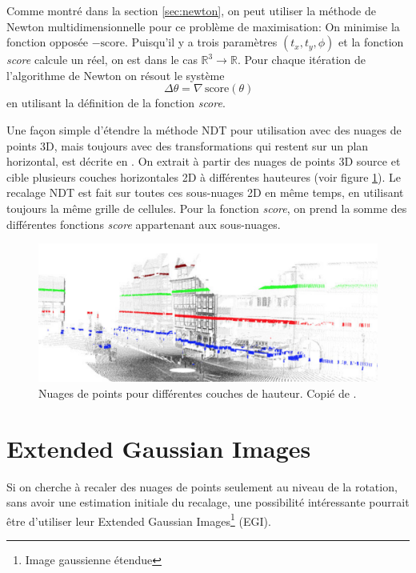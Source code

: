 \documentclass[a4paper,10pt]{scrreprt}
\begin{document}
Comme montré dans la section \ref{sec:newton}, on peut utiliser la méthode de Newton multidimensionnelle pour ce problème de maximisation: On minimise la fonction opposée $- \text{score}$. Puisqu'il y a trois paramètres $(t_x, t_y, \phi)$ et la fonction \emph{score} calcule un réel, on est dans le cas $\mathbb{R}^3 \rightarrow \mathbb{R}$. Pour chaque itération de l'algorithme de Newton on résout le système
\begin{equation*}
	[\mathbf{H} \, \text{score}(\theta)] \, \Delta \theta = \nabla \, \text{score}(\theta)
\end{equation*}
en utilisant la définition de la fonction \emph{score}.

Une façon simple d'étendre la méthode NDT pour utilisation avec des nuages de points 3D, mais toujours avec des transformations qui restent sur un plan horizontal, est décrite en \cite{Dold2007}. On extrait à partir des nuages de points 3D source et cible plusieurs couches horizontales 2D à différentes hauteures (voir figure \ref{fig:ndt3d}). Le recalage NDT est fait sur toutes ces sous-nuages 2D en même temps, en utilisant toujours la même grille de cellules. Pour la fonction \emph{score}, on prend la somme des différentes fonctions \emph{score} appartenant aux sous-nuages.

\begin{figure}[p]
\center
\includegraphics[width=\textwidth]{ndt3d.png}
\caption{Nuages de points pour différentes couches de hauteur. Copié de \cite{Dold2007}.}
\label{fig:ndt3d}
\end{figure}


\section{Extended Gaussian Images}
Si on cherche à recaler des nuages de points seulement au niveau de la rotation, sans avoir une estimation initiale du recalage, une possibilité intéressante pourrait être d'utiliser leur Extended Gaussian Images\footnote{Image gaussienne étendue} (EGI).
\end{document}
